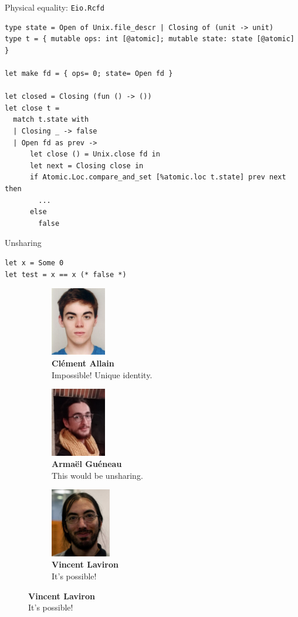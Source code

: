 \begin{frame}[fragile]{Physical equality: \texttt{Eio.Rcfd}}
\begin{verbatim}
type state = Open of Unix.file_descr | Closing of (unit -> unit)
type t = { mutable ops: int [@atomic]; mutable state: state [@atomic] }

let make fd = { ops= 0; state= Open fd }

let closed = Closing (fun () -> ())
let close t =
  match t.state with
  | Closing _ -> false
  | Open fd as prev ->
      let close () = Unix.close fd in
      let next = Closing close in
      if Atomic.Loc.compare_and_set [%atomic.loc t.state] prev next then
        ...
      else
        false
\end{verbatim}
\end{frame}

\begin{frame}[fragile]{Unsharing}
\Large
\begin{verbatim}
let x = Some 0
let test = x == x (* false *)
\end{verbatim}
\vfill
\begin{figure}
  \captionsetup{justification=centering}
  \begin{subfigure}[b]{0.3\textwidth}
    \centering
    \includegraphics[height=3cm]{images/clement_allain.jpg}
    \caption*{\footnotesize \textbf{Clément Allain} \\ Impossible! Unique identity.}
  \end{subfigure}
  \begin{subfigure}[b]{0.3\textwidth}
    \centering
    \includegraphics[height=3cm]{images/armael_gueneau.jpg}
    \caption*{\footnotesize \textbf{Armaël Guéneau} \\ This would be unsharing.}
  \end{subfigure}
  \begin{subfigure}[b]{0.3\textwidth}
    \centering
    \includegraphics[height=3cm]{images/vincent_laviron.jpg}
    \caption*{\footnotesize \textbf{Vincent Laviron} \\ It's possible!}
  \end{subfigure}
\end{figure}
\end{frame}

